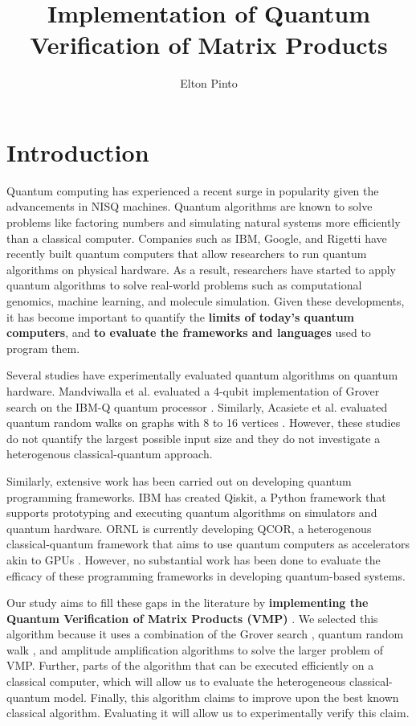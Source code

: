 \documentclass[10pt]{proc}
\title{
  Implementation of Quantum Verification of Matrix Products
}
\author{Elton Pinto}
\date{}
\theoremstyle{definition}
\theoremstyle{remark}
\begin{document}
\maketitle

\section{Introduction}

Quantum computing has experienced a recent surge in popularity given the
advancements in NISQ machines. Quantum algorithms are known to solve problems
like factoring numbers and simulating natural systems more efficiently than a
classical computer.  Companies such as IBM, Google, and Rigetti have recently
built quantum computers that allow researchers to run quantum algorithms on
physical hardware. As a result, researchers have started to apply quantum
algorithms to solve real-world problems such as computational genomics, machine
learning, and molecule simulation. Given these developments, it has become
important to quantify the \textbf{limits of today’s quantum computers}, and
\textbf{to evaluate the frameworks and languages} used to program them.

Several studies have experimentally evaluated quantum algorithms on quantum
hardware. Mandviwalla et al. evaluated a 4-qubit implementation of Grover
search on the IBM-Q quantum processor \cite{mandviwalla_implementing_2018}.
Similarly, Acasiete et al. evaluated quantum random walks on graphs with 8 to
16 vertices \cite{acasiete_implementation_2020}. However, these studies do not
quantify the largest possible input size and they do not investigate a
heterogenous classical-quantum approach.

Similarly, extensive work has been carried out on developing quantum
programming frameworks. IBM has created Qiskit, a Python framework that
supports prototyping and executing quantum algorithms on simulators and quantum
hardware. ORNL is currently developing QCOR, a heterogenous classical-quantum
framework that aims to use quantum computers as accelerators akin to GPUs
\cite{mintz_qcor_2020}. However, no substantial work has been done to evaluate
the efficacy of these programming frameworks in developing quantum-based
systems.

Our study aims to fill these gaps in the literature by \textbf{implementing the
Quantum Verification of Matrix Products (VMP)}
\cite{buhrman_quantum_2005}\cite{ambainis_quantum_2002}. We selected this
algorithm because it uses a combination of the Grover search
\cite{nielsen_quantum_2000}, quantum random walk \cite{ambainis_quantum_2007},
and amplitude amplification \cite{lomonaco_quantum_2002} algorithms to solve
the larger problem of VMP. Further, parts of the algorithm that can be executed
efficiently on a classical computer, which will allow us to evaluate the
heterogeneous classical-quantum model. Finally, this algorithm claims to
improve upon the best known classical algorithm. Evaluating it will allow us to
experimentally verify this claim.
\end{document}
